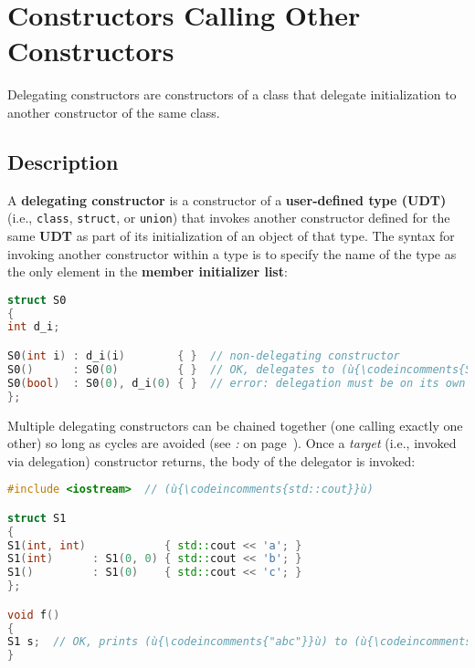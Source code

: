 \newpage
\section[Delegating Ctors]{Constructors Calling Other Constructors}\label{delegating-constructors}


Delegating constructors are constructors of a class that delegate initialization to another
constructor of the same class.

\subsection[Description]{Description}\label{description}

A \textbf{delegating constructor} is a constructor of a
\textbf{user-defined type (UDT)} (i.e., \texttt{class}, \texttt{struct}, or
\texttt{union}) that invokes another constructor defined for the same
\textbf{UDT} as part of its initialization of an object of that type.
The syntax for invoking another constructor within a type is to specify
the name of the type as the only element in the \textbf{member
initializer list}:

\begin{lstlisting}[language=C++]
struct S0
{
int d_i;

S0(int i) : d_i(i)        { }  // non-delegating constructor
S0()      : S0(0)         { }  // OK, delegates to (ù{\codeincomments{S0(int)}}ù)
S0(bool)  : S0(0), d_i(0) { }  // error: delegation must be on its own
};
\end{lstlisting}

\noindent Multiple delegating constructors can be chained together (one calling
exactly one other) so long as cycles are avoided (see
{\it{}:} {\it{}} on page~\pageref{delegation-cycles}). Once a \emph{target} (i.e., invoked via delegation) constructor returns,
the body of the delegator is invoked:

\begin{lstlisting}[language=C++]
#include <iostream>  // (ù{\codeincomments{std::cout}}ù)

struct S1
{
S1(int, int)            { std::cout << 'a'; }
S1(int)      : S1(0, 0) { std::cout << 'b'; }
S1()         : S1(0)    { std::cout << 'c'; }
};

void f()
{
S1 s;  // OK, prints (ù{\codeincomments{"abc"}}ù) to (ù{\codeincomments{stdout}}ù)
}
\end{lstlisting}

